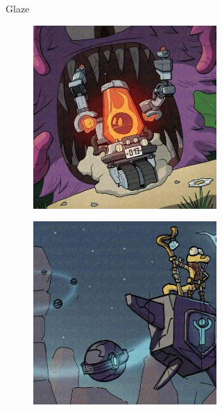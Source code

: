 \documentclass{article}
\begin{document}
\begin{figure}[h]
\begin{subfigure}[t]{\textwidth}
\begin{subfigure}[b]{0.24\textwidth}
     \end{subfigure}
    \caption{Glaze}
    \vspace{0.5em}
    \end{subfigure}
    \begin{subfigure}[t]{\textwidth}
        \begin{subfigure}[b]{0.24\textwidth}
         \centering
         \includegraphics[width=\textwidth]{plots/process/mist/0000.jpeg}
     \end{subfigure}
     \hfill
     \begin{subfigure}[b]{0.24\textwidth}
         \centering
         \includegraphics[width=\textwidth]{plots/process/mist/0001.jpeg}

\end{subfigure}
\end{subfigure}
\end{figure}
\end{document}
